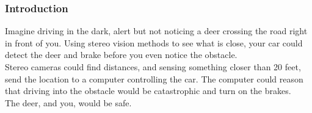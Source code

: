 \documentclass[19pt]{beamer}
\begin{document}

\begin{frame}
\frametitle{Introduction}

Imagine driving in the dark, alert but not noticing a deer crossing the road right in front of you. Using stereo vision methods to see what is close, your car could detect the deer and brake before you even notice the obstacle. \\[10pt]
%
Stereo cameras could find distances, and sensing something closer than 20 feet, send the location to a computer controlling the car. The computer could reason that driving into the obstacle would be catastrophic and turn on the brakes. \\[10pt]
%
The deer, and you, would be safe.
\end{frame}
\end{document}
